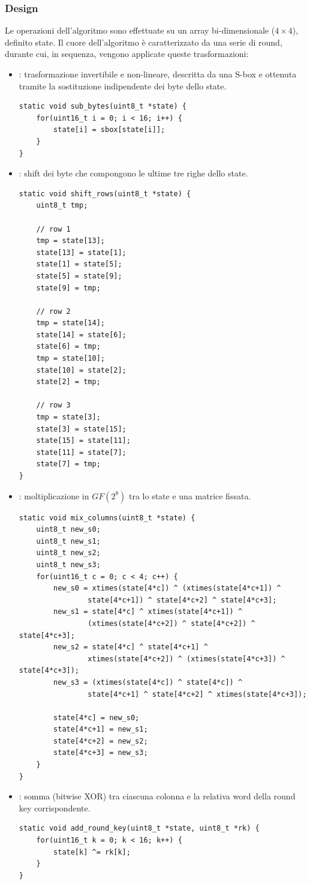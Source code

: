 \documentclass[target=bach,aauheader=,style=]{thud}
\begin{document}
			\subsubsection{Design}
			Le operazioni dell'algoritmo sono effettuate su un array bi-dimensionale ($4 \times 4$), definito state. Il cuore dell'algoritmo è caratterizzato da una serie di round, durante cui, in sequenza, vengono applicate queste trasformazioni:
			\begin{itemize}
				\item {} : trasformazione invertibile e non-lineare, descritta da una S-box e ottenuta tramite la sostituzione indipendente dei byte dello state.
				\begin{lstlisting}[style=CStyle]
static void sub_bytes(uint8_t *state) {
	for(uint16_t i = 0; i < 16; i++) {	
		state[i] = sbox[state[i]];
	}
}\end{lstlisting}
				\item {} : shift dei byte che compongono le ultime tre righe dello state.
				\begin{lstlisting}[style=CStyle]
static void shift_rows(uint8_t *state) {
	uint8_t tmp;
	
	// row 1
	tmp = state[13];
	state[13] = state[1];
	state[1] = state[5];
	state[5] = state[9];
	state[9] = tmp;
	
	// row 2
	tmp = state[14];
	state[14] = state[6];
	state[6] = tmp;
	tmp = state[10];
	state[10] = state[2];
	state[2] = tmp;
	
	// row 3
	tmp = state[3];
	state[3] = state[15];
	state[15] = state[11];
	state[11] = state[7];
	state[7] = tmp;
}\end{lstlisting}
				\item {} : moltiplicazione in $GF(2^8)$ tra lo state e una matrice fissata.

				\begin{lstlisting}[style=CStyle]
static void mix_columns(uint8_t *state) {
	uint8_t new_s0;
	uint8_t new_s1;
	uint8_t new_s2;
	uint8_t new_s3;
	for(uint16_t c = 0; c < 4; c++) {
		new_s0 = xtimes(state[4*c]) ^ (xtimes(state[4*c+1]) ^ 
				state[4*c+1]) ^ state[4*c+2] ^ state[4*c+3];
		new_s1 = state[4*c] ^ xtimes(state[4*c+1]) ^ 
				(xtimes(state[4*c+2]) ^ state[4*c+2]) ^ state[4*c+3];
		new_s2 = state[4*c] ^ state[4*c+1] ^ 
				xtimes(state[4*c+2]) ^ (xtimes(state[4*c+3]) ^ state[4*c+3]);
		new_s3 = (xtimes(state[4*c]) ^ state[4*c]) ^ 
				state[4*c+1] ^ state[4*c+2] ^ xtimes(state[4*c+3]);
		
		state[4*c] = new_s0;
		state[4*c+1] = new_s1;
		state[4*c+2] = new_s2;
		state[4*c+3] = new_s3;
	}
}\end{lstlisting}
				\item {} : somma (bitwise XOR) tra ciascuna colonna e la relativa word della round key corrispondente.

				\begin{lstlisting}[style=CStyle]
static void add_round_key(uint8_t *state, uint8_t *rk) {
	for(uint16_t k = 0; k < 16; k++) {
		state[k] ^= rk[k];
	}
}\end{lstlisting}
			\end{itemize}
			
\end{document}

